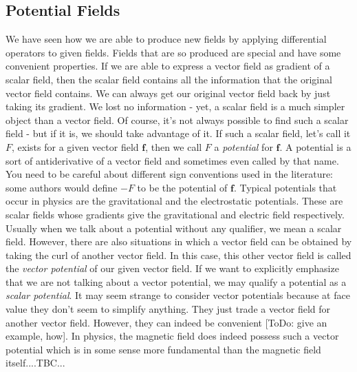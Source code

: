 \subsection{Potential Fields}
We have seen how we are able to produce new fields by applying differential operators to given fields. Fields that are so produced are special and have some convenient properties. If we are able to express a vector field as gradient of a scalar field, then the scalar field contains all the information that the original vector field contains. We can always get our original vector field back by just taking its gradient. We lost no information - yet, a scalar field is a much simpler object than a vector field. Of course, it's not always possible to find such a scalar field - but if it is, we should take advantage of it. If such a scalar field, let's call it $F$, exists for a given vector field $\mathbf{f}$, then we call $F$ a \emph{potential} for $\mathbf{f}$. A potential is a sort of antiderivative of a vector field and sometimes even called by that name. You need to be careful about different sign conventions used in the literature: some authors would define $-F$ to be the potential of $\mathbf{f}$. Typical potentials that occur in physics are the gravitational and the electrostatic potentials. These are scalar fields whose gradients give the gravitational and electric field respectively. Usually when we talk about a potential without any qualifier, we mean a scalar field. However, there are also situations in which a vector field can be obtained by taking the curl of another vector field. In this case, this other vector field is called the \emph{vector potential} of our given vector field. If we want to explicitly emphasize that we are not talking about a vector potential, we may qualify a potential as a \emph{scalar potential}. It may seem strange to consider vector potentials because at face value they don't seem to simplify anything. They just trade a vector field for another vector field. However, they can indeed be convenient [ToDo: give an example, how]. In physics, the magnetic field does indeed possess such a vector potential which is in some sense more fundamental than the magnetic field itself....TBC...



